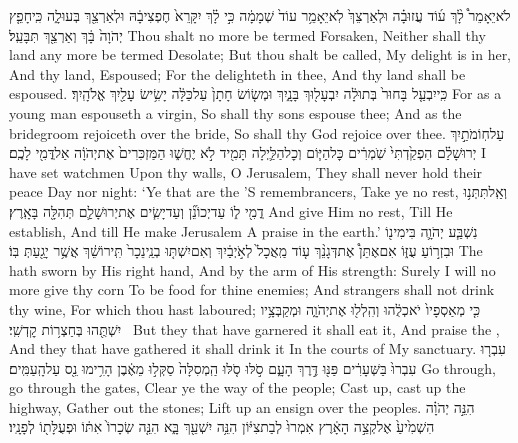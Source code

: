 {לֹא\maqqaf יֵאָמֵר֩ לָ֨ךְ ע֜וֹד עֲזוּבָ֗ה וּלְאַרְצֵךְ֙ לֹֽא\maqqaf יֵאָמֵ֥ר עוֹד֙ שְׁמָמָ֔ה כִּ֣י לָ֗ךְ יִקָּרֵא֙ חֶפְצִי\maqqaf בָ֔הּ וּלְאַרְצֵ֖ךְ בְּעוּלָ֑ה כִּֽי\maqqaf חָפֵ֤ץ יְהֹוָה֙ בָּ֔ךְ וְאַרְצֵ֖ךְ תִּבָּעֵֽל׃}
{Thou shalt no more be termed Forsaken, Neither shall thy land any more be termed Desolate; But thou shalt be called, My delight is in her, And thy land, Espoused; For the \lord\space delighteth in thee, And thy land shall be espoused.}
{כִּֽי\maqqaf יִבְעַ֤ל בָּחוּר֙ בְּתוּלָ֔ה יִבְעָל֖וּךְ בָּנָ֑יִךְ וּמְשׂ֤וֹשׂ חָתָן֙ עַל\maqqaf כַּלָּ֔ה יָשִׂ֥ישׂ עָלַ֖יִךְ אֱלֹהָֽיִךְ׃}
{For as a young man espouseth a virgin, So shall thy sons espouse thee; And as the bridegroom rejoiceth over the bride, So shall thy God rejoice over thee.}
{עַל\maqqaf חֽוֹמֹתַ֣יִךְ יְרוּשָׁלַ֗͏ִם הִפְקַ֙דְתִּי֙ שֹֽׁמְרִ֔ים כׇּל\maqqaf הַיּ֧וֹם וְכׇל\maqqaf הַלַּ֛יְלָה תָּמִ֖יד לֹ֣א יֶחֱשׁ֑וּ הַמַּזְכִּרִים֙ אֶת\maqqaf יְהֹוָ֔ה אַל\maqqaf דֳּמִ֖י לָכֶֽם׃}
{I have set watchmen Upon thy walls, O Jerusalem, They shall never hold their peace Day nor night: ‘Ye that are the \lord’S remembrancers, Take ye no rest,}
{וְאַֽל\maqqaf תִּתְּנ֥וּ דֳמִ֖י ל֑וֹ עַד\maqqaf יְכוֹנֵ֞ן וְעַד\maqqaf יָשִׂ֧ים אֶת\maqqaf יְרוּשָׁלַ֛͏ִם תְּהִלָּ֖ה בָּאָֽרֶץ׃}
{And give Him no rest, Till He establish, And till He make Jerusalem A praise in the earth.’}
{נִשְׁבַּ֧ע יְהֹוָ֛ה בִּימִינ֖וֹ וּבִזְר֣וֹעַ עֻזּ֑וֹ אִם\maqqaf אֶתֵּן֩ אֶת\maqqaf דְּגָנֵ֨ךְ ע֤וֹד מַֽאֲכָל֙ לְאֹ֣יְבַ֔יִךְ וְאִם\maqqaf יִשְׁתּ֤וּ בְנֵֽי\maqqaf נֵכָר֙ תִּֽירוֹשֵׁ֔ךְ אֲשֶׁ֥ר יָגַ֖עַתְּ בּֽוֹ׃}
{The \lord\space hath sworn by His right hand, And by the arm of His strength: Surely I will no more give thy corn To be food for thine enemies; And strangers shall not drink thy wine, For which thou hast laboured;}
{כִּ֤י מְאַסְפָיו֙ יֹאכְלֻ֔הוּ וְהִֽלְל֖וּ אֶת\maqqaf יְהֹוָ֑ה וּמְקַבְּצָ֥יו יִשְׁתֻּ֖הוּ בְּחַצְר֥וֹת קׇדְשִֽׁי׃ \setuma }
{But they that have garnered it shall eat it, And praise the \lord, And they that have gathered it shall drink it In the courts of My sanctuary.}
{עִבְר֤וּ עִבְרוּ֙ בַּשְּׁעָרִ֔ים פַּנּ֖וּ דֶּ֣רֶךְ הָעָ֑ם סֹ֣לּוּ סֹ֤לּוּ הַֽמְסִלָּה֙ סַקְּל֣וּ מֵאֶ֔בֶן הָרִ֥ימוּ נֵ֖ס עַל\maqqaf הָֽעַמִּֽים׃}
{Go through, go through the gates, Clear ye the way of the people; Cast up, cast up the highway, Gather out the stones; Lift up an ensign over the peoples.}
{הִנֵּ֣ה יְהֹוָ֗ה הִשְׁמִ֙יעַ֙ אֶל\maqqaf קְצֵ֣ה הָאָ֔רֶץ אִמְרוּ֙ לְבַת\maqqaf צִיּ֔וֹן הִנֵּ֥ה יִשְׁעֵ֖ךְ בָּ֑א הִנֵּ֤ה שְׂכָרוֹ֙ אִתּ֔וֹ וּפְעֻלָּת֖וֹ לְפָנָֽיו׃}
